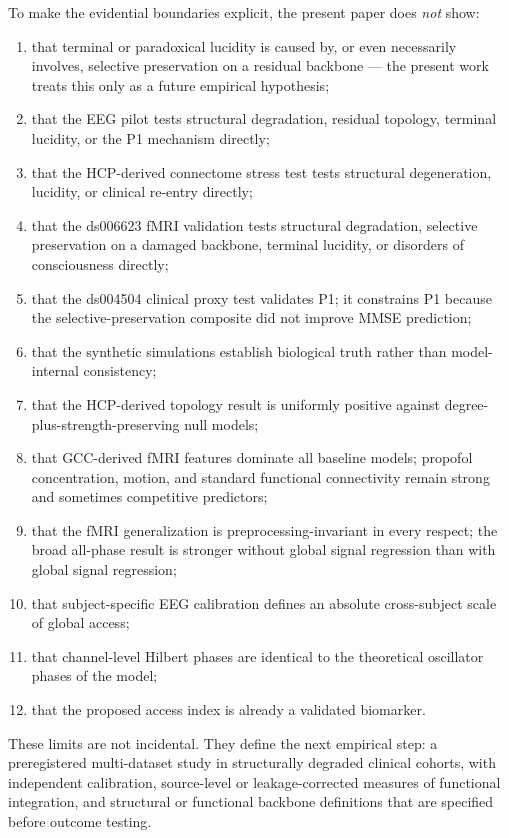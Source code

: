 \documentclass[11pt,a4paper]{article}
\theoremstyle{plain}
\theoremstyle{definition}
\theoremstyle{remark}
\begin{document}
To make the evidential boundaries explicit, the present paper does \emph{not} show:
\begin{enumerate}
\item that terminal or paradoxical lucidity is caused by, or even necessarily involves, selective preservation on a residual backbone --- the present work treats this only as a future empirical hypothesis;
\item that the EEG pilot tests structural degradation, residual topology, terminal lucidity, or the P1 mechanism directly;
\item that the HCP-derived connectome stress test tests structural degeneration, lucidity, or clinical re-entry directly;
\item that the ds006623 fMRI validation tests structural degradation, selective preservation on a damaged backbone, terminal lucidity, or disorders of consciousness directly;
\item that the ds004504 clinical proxy test validates P1; it constrains P1 because the selective-preservation composite did not improve MMSE prediction;
\item that the synthetic simulations establish biological truth rather than model-internal consistency;
\item that the HCP-derived topology result is uniformly positive against degree-plus-strength-preserving null models;
\item that GCC-derived fMRI features dominate all baseline models; propofol concentration, motion, and standard functional connectivity remain strong and sometimes competitive predictors;
\item that the fMRI generalization is preprocessing-invariant in every respect; the broad all-phase result is stronger without global signal regression than with global signal regression;
\item that subject-specific EEG calibration defines an absolute cross-subject scale of global access;
\item that channel-level Hilbert phases are identical to the theoretical oscillator phases of the model;
\item that the proposed access index is already a validated biomarker.
\end{enumerate}

These limits are not incidental. They define the next empirical step: a preregistered multi-dataset study in structurally degraded clinical cohorts, with independent calibration, source-level or leakage-corrected measures of functional integration, and structural or functional backbone definitions that are specified before outcome testing.
\end{document}
